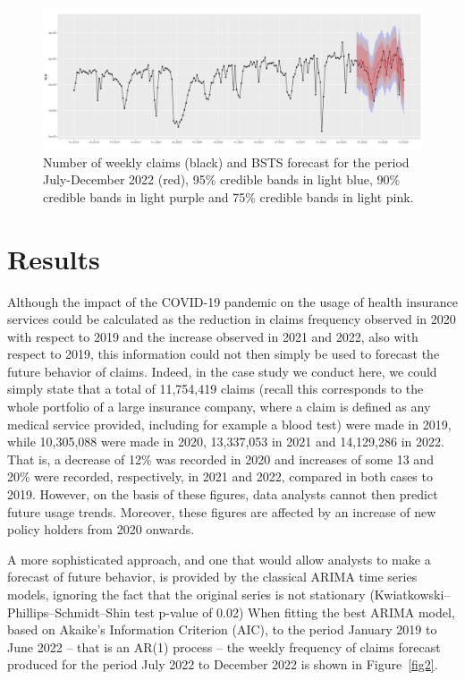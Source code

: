 \documentclass[]{risa}
\begin{document}
\begin{center}
  \begin{figure}[h]
	\begin{minipage}{160mm}
    \includegraphics[width=16cm]{bsts_global_prediction.png}\caption{Number of weekly claims (black) and BSTS forecast for the period July-December 2022 (red), 95\% credible bands in light blue, 90\% credible bands in light purple and 75\% credible bands in light pink.}\label{fig3}
  \end{minipage}
  \end{figure}
\end{center}

\section{Results}\label{results}
Although the impact of the COVID-19 pandemic on the usage of health insurance services could be calculated as the reduction in claims frequency observed in 2020 with respect to 2019 and the increase observed in 2021 and 2022, also with respect to 2019, this information could not then simply be used to forecast the future behavior of claims. Indeed, in the case study we conduct here, we could simply state that a total of 11,754,419 claims (recall this corresponds to the whole portfolio of a large insurance company, where a claim is defined as any medical service provided, including for example a blood test) were made in 2019, while 10,305,088 were made in 2020, 13,337,053 in 2021 and 14,129,286 in 2022. That is, a decrease of 12\% was recorded in 2020 and increases of some 13 and 20\% were recorded, respectively, in 2021 and 2022, compared in both cases to 2019. However, on the basis of these figures, data analysts cannot then predict future usage trends. Moreover, these figures are affected by an increase of new policy holders from 2020 onwards. 


A more sophisticated approach, and one that would allow analysts to make a forecast of future behavior, is provided by the classical ARIMA time series models, ignoring the fact that the original series is not stationary (Kwiatkowski–Phillips–Schmidt–Shin test p-value of 0.02) %
When fitting the best ARIMA model, based on Akaike’s Information Criterion (AIC), to the period January 2019 to June 2022 – that is an AR(1) process – the weekly frequency of claims forecast produced for the period July 2022 to December 2022 is shown in Figure~\ref{fig2}. 
\end{document}
